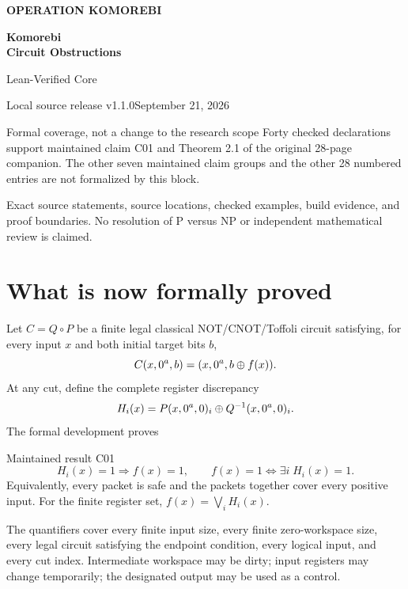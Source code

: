 \documentclass[11pt,letterpaper]{article}
\begin{document}
\begin{titlepage}\thispagestyle{empty}
{\small\sffamily\bfseries\color{accent}OPERATION KOMOREBI}\par
\vspace{.95in}
{\fontsize{32}{36}\selectfont\sffamily\bfseries\color{ink}Komorebi\\[3pt]Circuit Obstructions}\par
\vspace{.32in}
{\fontsize{23}{28}\selectfont\sffamily Lean-Verified Core}\par
{}\par
\vspace{.5in}{\color{accent}\rule{.67\linewidth}{1.3pt}}\par
\vspace{.24in}{\large Komorebi P.}\par
{\small\sffamily Local source release v1.1.0\quad\textbullet\quad September 21, 2026}\par
\vfill
\begin{statusbox}{Formal coverage, not a change to the research scope}
Forty checked declarations support maintained claim C01 and Theorem 2.1 of the original 28-page companion. The other seven maintained claim groups and the other 28 numbered entries are not formalized by this block.
\end{statusbox}
{\small Exact source statements, source locations, checked examples, build evidence, and proof boundaries. No resolution of P versus NP or independent mathematical review is claimed.}
\end{titlepage}
\setcounter{page}{2}
\section*{What is now formally proved}
Let $C=Q\circ P$ be a finite legal classical NOT/CNOT/Toffoli circuit satisfying, for every input $x$ and both initial target bits $b$,
\[
C(x,0^a,b)=(x,0^a,b\oplus f(x)).
\]
At any cut, define the complete register discrepancy
\[
H_i(x)=P(x,0^a,0)_i\oplus Q^{-1}(x,0^a,0)_i.
\]
The formal development proves
\begin{statusbox}{Maintained result C01}
\[
H_i(x)=1\Longrightarrow f(x)=1,
\qquad
f(x)=1\Longleftrightarrow\exists i\;H_i(x)=1.
\]
Equivalently, every packet is safe and the packets together cover every positive input. For the finite register set, $f(x)=\bigvee_i H_i(x)$.
\end{statusbox}
The quantifiers cover every finite input size, every finite zero-workspace size, every legal circuit satisfying the endpoint condition, every logical input, and every cut index. Intermediate workspace may be dirty; input registers may change temporarily; the designated output may be used as a control.
\end{document}
